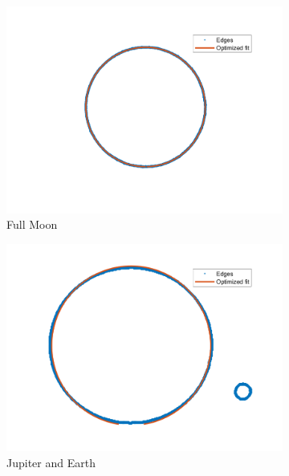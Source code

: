 \begin{figure}[!ht]
    \centering
    \begin{subfigure}{0.32\textwidth}
        \centering
        \includegraphics[width=\textwidth]{Doc/Graphics/Part3/Optimization_moon.png}
        \caption{Full Moon}
    \end{subfigure}
    \hfill
    \begin{subfigure}{0.32\textwidth}
        \centering
        \includegraphics[width=\textwidth]{Doc/Graphics/Part3/Optimization_jupiter_earth.png}
        \caption{Jupiter and Earth}
    \end{subfigure}
    \hfill
    \begin{subfigure}{0.32\textwidth}
        \centering

\end{subfigure}
\end{figure}
